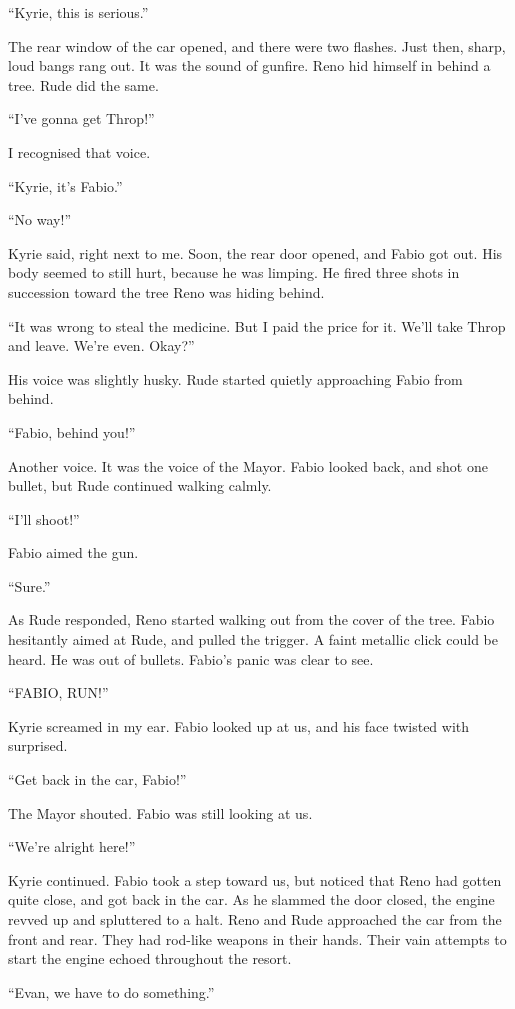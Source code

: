 \documentclass[oneside]{book}
\begin{document}
“Kyrie, this is serious.”

The rear window of the car opened, and there were two flashes. Just then, sharp, loud bangs rang out. It was the sound of gunfire. Reno hid himself in behind a tree. Rude did the same.

“I’ve gonna get Throp!”

I recognised that voice.

“Kyrie, it’s Fabio.”

“No way!”

Kyrie said, right next to me. Soon, the rear door opened, and Fabio got out. His body seemed to still hurt, because he was limping. He fired three shots in succession toward the tree Reno was hiding behind.

“It was wrong to steal the medicine. But I paid the price for it. We’ll take Throp and leave. We’re even. Okay?”

His voice was slightly husky. Rude started quietly approaching Fabio from behind.

“Fabio, behind you!”

Another voice. It was the voice of the Mayor. Fabio looked back, and shot one bullet, but Rude continued walking calmly.

“I’ll shoot!”

Fabio aimed the gun.

“Sure.”

As Rude responded, Reno started walking out from the cover of the tree. Fabio hesitantly aimed at Rude, and pulled the trigger. A faint metallic click could be heard. He was out of bullets. Fabio’s panic was clear to see.

“FABIO, RUN!”

Kyrie screamed in my ear. Fabio looked up at us, and his face twisted with surprised.

“Get back in the car, Fabio!”

The Mayor shouted. Fabio was still looking at us.

“We’re alright here!”

Kyrie continued. Fabio took a step toward us, but noticed that Reno had gotten quite close, and got back in the car. As he slammed the door closed, the engine revved up and spluttered to a halt. Reno and Rude approached the car from the front and rear. They had rod-like weapons in their hands. Their vain attempts to start the engine echoed throughout the resort.

“Evan, we have to do something.”
\end{document}
